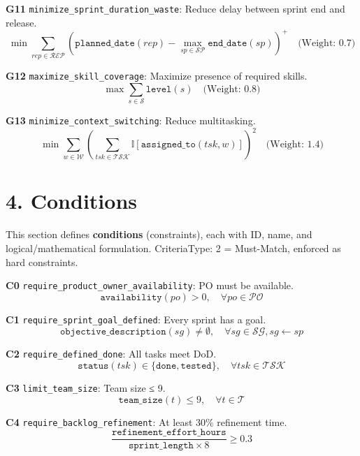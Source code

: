 \documentclass[12pt]{article}
\begin{document}
    \item[\textbf{G11}] \texttt{minimize\_sprint\_duration\_waste}: Reduce delay between sprint end and release.
    \[
    \min \sum_{rep \in \mathcal{REP}} \left( \texttt{planned\_date}(rep) - \max_{sp \in \mathcal{SP}} \texttt{end\_date}(sp) \right)^+ \quad \text{(Weight: 0.7)}
    \]

    \item[\textbf{G12}] \texttt{maximize\_skill\_coverage}: Maximize presence of required skills.
    \[
    \max \sum_{s \in \mathcal{S}} \texttt{level}(s) \quad \text{(Weight: 0.8)}
    \]

    \item[\textbf{G13}] \texttt{minimize\_context\_switching}: Reduce multitasking.
    \[
    \min \sum_{w \in \mathcal{W}} \left( \sum_{tsk \in \mathcal{TSK}} \mathbb{I}[\texttt{assigned\_to}(tsk, w)] \right)^2 \quad \text{(Weight: 1.4)}
    \]

\section{4. Conditions}

This section defines \textbf{conditions} (constraints), each with ID, name, and logical/mathematical formulation. CriteriaType: 2 = Must-Match, enforced as hard constraints.

\item[\textbf{C0}] \texttt{require\_product\_owner\_availability}: PO must be available.
    \[
    \texttt{availability}(po) > 0, \quad \forall po \in \mathcal{PO}
    \]

    \item[\textbf{C1}] \texttt{require\_sprint\_goal\_defined}: Every sprint has a goal.
    \[
    \texttt{objective\_description}(sg) \neq \emptyset, \quad \forall sg \in \mathcal{SG}, sg \leftarrow sp
    \]

    \item[\textbf{C2}] \texttt{require\_defined\_done}: All tasks meet DoD.
    \[
    \texttt{status}(tsk) \in \{\texttt{done}, \texttt{tested}\}, \quad \forall tsk \in \mathcal{TSK}
    \]

    \item[\textbf{C3}] \texttt{limit\_team\_size}: Team size ≤ 9.
    \[
    \texttt{team\_size}(t) \leq 9, \quad \forall t \in \mathcal{T}
    \]

    \item[\textbf{C4}] \texttt{require\_backlog\_refinement}: At least 30\% refinement time.
    \[
    \frac{\texttt{refinement\_effort\_hours}}{\texttt{sprint\_length} \times 8} \geq 0.3
    \]
\end{document}
